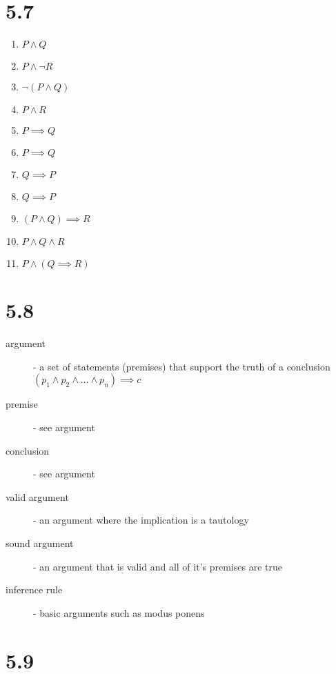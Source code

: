 \documentclass{article}
\begin{document}
\section*{5.7}

\begin{enumerate}[label=\alph*)]
\item $ P \land Q $
\item $ P \land \neg R $
\item $ \neg (P \land Q) $
\item $ P \land R $
\item $ P \implies Q $
\item $ P \implies Q $
\item $ Q \implies P $
\item $ Q \implies P $
\item $ (P \land Q) \implies R $
\item $ P \land Q \land R $
\item $ P \land (Q \implies R) $
\end{enumerate}

\section*{5.8}

\begin{description}
\item[argument] - a set of statements (premises) that support the truth of a conclusion 
  $(p_1 \land p_2 \land \ldots \land p_n) \implies c$
\item[premise] - see argument
\item[conclusion] - see argument
\item[valid argument] - an argument where the implication is a tautology
\item[sound argument] - an argument that is valid and all of it's premises are true
\item[inference rule] - basic arguments such as modus ponens
\end{description}

\section*{5.9}
\end{document}
